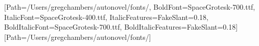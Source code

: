\usepackage{fontspec}
\usepackage{graphicx}
\usepackage[paperwidth=8in,paperheight=19in,margin=0.9in]{geometry}
\usepackage{xcolor}
\usepackage{titlesec}
\color{ink}
\setmainfont{SpaceGrotesk-400.ttf}[Path=/Users/gregchambers/autonovel/fonts/,
  BoldFont=SpaceGrotesk-700.ttf,
  ItalicFont=SpaceGrotesk-400.ttf, ItalicFeatures={FakeSlant=0.18},
  BoldItalicFont=SpaceGrotesk-700.ttf, BoldItalicFeatures={FakeSlant=0.18}]
\newfontfamily{}[Path=/Users/gregchambers/autonovel/fonts/]
\setlength{\parindent}{0pt}\setlength{\parskip}{7pt}\linespread{1.08}
\titleformat{\section}{\disp\LARGE\color{deeppink}}{}{0pt}{}
\titleformat{\subsection}{\disp\large\color{deeppink}}{}{0pt}{}
\titlespacing*{\section}{0pt}{10pt}{4pt}
\titlespacing*{\subsection}{0pt}{12pt}{2pt}
\renewenvironment{quote}{\par\smallskip\begingroup\color{ink}\itshape
  \setlength{\leftskip}{1.2em}\rule{2pt}{0pt}}{\endgroup\par\smallskip}
\AtBeginDocument{\hypersetup{colorlinks=true,urlcolor=teal,linkcolor=teal}}
